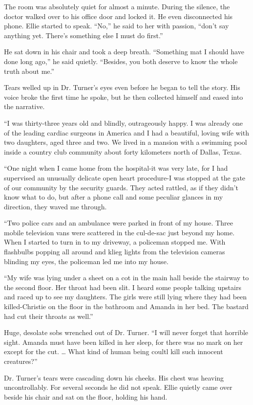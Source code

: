 \documentclass[]{article}
\begin{document}
{The room was absolutely quiet for almost a minute. During the silence, the doctor walked over to his office door and locked it. He even disconnected his phone. Ellie started to speak. “No,” he said to her with passion, “don’t say anything yet. There’s something else I must do first.”

He sat down in his chair and took a deep breath. “Something mat I should have done long ago,” he said quietly. “Besides, you both deserve to know the whole truth about me.”

Tears welled up in Dr. Turner’s eyes even before he began to tell the story. His voice broke the first time he spoke, but he then collected himself and eased into the narrative.

“I was thirty-three years old and blindly, outrageously happy. I was already one of the leading cardiac surgeons in America and I had a beautiful, loving wife with two daughters, aged three and two. We lived in a mansion with a swimming pool inside a country club community about forty kilometers north of Dallas, Texas.

“One night when I came home from the hospital-it was very late, for I had supervised an unusually delicate open heart procedure-I was stopped at the gate of our community by the security guards. They acted rattled, as if they didn’t know what to do, but after a phone call and some peculiar glances in my direction, they waved me through.

“Two police cars and an ambulance were parked in front of my house. Three mobile television vans were scattered in the cul-de-sac just beyond my home. When I started to turn in to my driveway, a policeman stopped me. With flashbulbs popping all around and klieg lights from the television cameras blinding my eyes, the policeman led me into my house.

“My wife was lying under a sheet on a cot in the main hall beside the stairway to the second floor. Her throat had been slit. I heard some people talking upstairs and raced up to see my daughters. The girls were still lying where they had been killed-Christie on the floor in the bathroom and Amanda in her bed. The bastard had cut their throats as well.”

Huge, desolate sobs wrenched out of Dr. Turner. “I will never forget that horrible sight. Amanda must have been killed in her sleep, for there was no mark on her except for the cut. … What kind of human being coultl kill such innocent creatures?”

Dr. Turner’s tears were cascading down his cheeks. His chest was heaving uncontrollably. For several seconds he did not speak. Ellie quietly came over beside his chair and sat on the floor, holding his hand.

}
\end{document}

